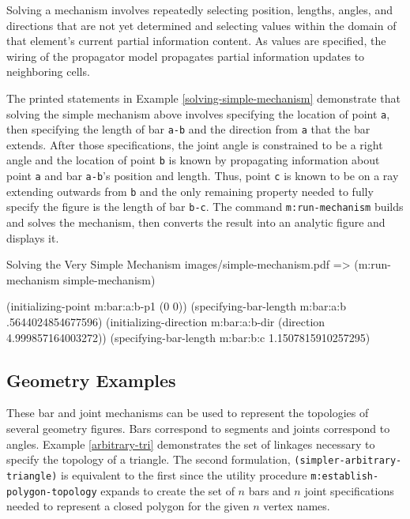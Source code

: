 Solving a mechanism involves repeatedly selecting position, lengths,
angles, and directions that are not yet determined and selecting
values within the domain of that element's current partial information
content. As values are specified, the wiring of the propagator model
propagates partial information updates to neighboring cells.

The printed statements in Example \ref{solving-simple-mechanism}
demonstrate that solving the simple mechanism above involves
specifying the location of point \texttt{a}, then specifying the
length of bar \texttt{a-b} and the direction from \texttt{a} that the
bar extends. After those specifications, the joint angle is
constrained to be a right angle and the location of point \texttt{b}
is known by propagating information about point \texttt{a} and bar
\texttt{a-b}'s position and length. Thus, point \texttt{c} is known to
be on a ray extending outwards from \texttt{b} and the only remaining
property needed to fully specify the figure is the length of bar
\texttt{b-c}. The command \texttt{m:run-mechanism} builds and solves
the mechanism, then converts the result into an analytic figure and
displays it.

\begin{pdf-example}
[label=solving-simple-mechanism]
{Solving the Very Simple Mechanism}
{images/simple-mechanism.pdf}
=> (m:run-mechanism simple-mechanism)

(initializing-point m:bar:a:b-p1 (0 0))
(specifying-bar-length m:bar:a:b .5644024854677596)
(initializing-direction m:bar:a:b-dir (direction 4.999857164003272))
(specifying-bar-length m:bar:b:c 1.1507815910257295)
\end{pdf-example}

\subsection{Geometry Examples}

These bar and joint mechanisms can be used to represent the topologies
of several geometry figures. Bars correspond to segments and joints
correspond to angles. Example \ref{arbitrary-tri} demonstrates the set
of linkages necessary to specify the topology of a triangle. The
second formulation, \texttt{(simpler-arbitrary-triangle)} is
equivalent to the first since the utility procedure
\texttt{m:establish-polygon-topology} expands to create the set of $n$
bars and $n$ joint specifications needed to represent a closed polygon
for the given $n$ vertex names.

